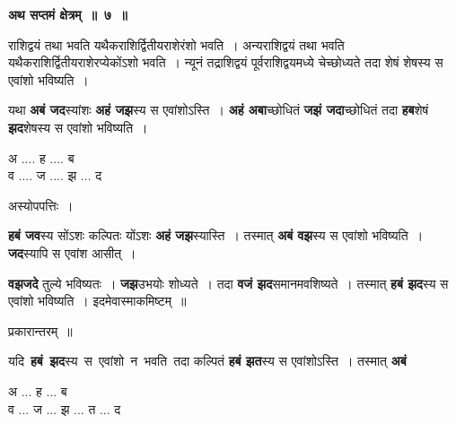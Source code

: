 \documentclass[11pt, openany]{book}
\begin{document}
\begin{center}
\textbf{\large अथ सप्तमं क्षेत्रम्~॥~७~॥}
\end{center}

{\ab राशिद्वयं तथा भवति यथैकराशिर्द्वितीयराशेरंशो भवति~। अन्यराशिद्वयं तथा भवति यथैकराशिर्द्वितीयराशेरप्येकोंऽशो भवति~। न्यूनं तद्राशिद्वयं पूर्वराशिद्वयमध्ये  चेच्छोध्यते तदा शेषं शेषस्य स एवांशो भविष्यति~।}

\begin{flushleft}
\begin{minipage}[t]{0.6\textwidth}
\hspace{4mm} यथा \textbf{अबं जद}स्यांशः \textbf{अहं जझ}स्य स एवांशोऽस्ति~। \textbf{अहं अबा}च्छोधितं \textbf{जझं जदा}च्छोधितं तदा \textbf{हब}शेषं \textbf{झद}शेषस्य स एवांशो भविष्यति~।
\end{minipage} 
\hfill
\begin{minipage}[t]{0.3\textwidth}
अ .... ह .... ब\\
व .... ज .... झ ... द
\end{minipage}
\end{flushleft}
\vspace{-3mm}

\begin{center}
अस्योपपत्तिः~।
\end{center}

\textbf{हबं जव}स्य सोंऽशः कल्पितः योंऽशः \textbf{अहं जझ}स्यास्ति~। तस्मात् \textbf{अबं वझ}स्य स एवांशो भविष्यति~। \textbf{जद}स्यापि स एवांश आसीत्~। 

\newpage
\noindent \textbf{वझजदे} तुल्ये भविष्यतः~। \textbf{जझ}उभयोः शोध्यते~। तदा \textbf{वजं झद}समानमवशिष्यते~। तस्मात् \textbf{हबं झद}स्य स एवांशो भविष्यति~। इदमेवास्माकमिष्टम्~॥ 

\begin{center}
प्रकारान्तरम्~॥
\end{center}

\begin{flushleft}
\begin{minipage}[t]{0.6\textwidth}
\hspace{4mm} यदि \,\textbf{हबं \,झद}स्य \,स \,एवांशो \,न \,भवति \,तदा कल्पितं \textbf{हबं झत}स्य स एवांशोऽस्ति~। तस्मात् \textbf{अबं}
\end{minipage} 
\hfill
\begin{minipage}[t]{0.3\textwidth}
अ ... ह ... ब \\
व ... ज ... झ ... त ... द
\end{minipage}
\end{flushleft}
\vspace{-3mm}
\end{document}
